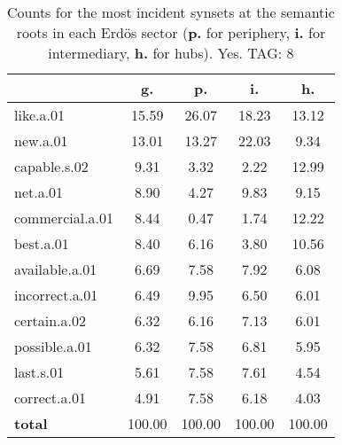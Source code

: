 \begin{table}[h!]
\begin{center}
\begin{tabular}{| l | c | c | c | c |}\hline
 & g. & p. & i. & h. \\\hline
like.a.01 & 15.59  & 26.07  & 18.23  & 13.12 \\\hline
new.a.01 & 13.01  & 13.27  & 22.03  & 9.34 \\\hline
capable.s.02 & 9.31  & 3.32  & 2.22  & 12.99 \\\hline
net.a.01 & 8.90  & 4.27  & 9.83  & 9.15 \\\hline
commercial.a.01 & 8.44  & 0.47  & 1.74  & 12.22 \\\hline
best.a.01 & 8.40  & 6.16  & 3.80  & 10.56 \\\hline
available.a.01 & 6.69  & 7.58  & 7.92  & 6.08 \\\hline
incorrect.a.01 & 6.49  & 9.95  & 6.50  & 6.01 \\\hline
certain.a.02 & 6.32  & 6.16  & 7.13  & 6.01 \\\hline
possible.a.01 & 6.32  & 7.58  & 6.81  & 5.95 \\\hline
last.s.01 & 5.61  & 7.58  & 7.61  & 4.54 \\\hline
correct.a.01 & 4.91  & 7.58  & 6.18  & 4.03 \\\hline
{{\bf total}} & 100.00  & 100.00  & 100.00  & 100.00 \\\hline
\end{tabular}
\caption{Counts for the most incident synsets at the semantic roots in each Erd\"os sector ({\bf p.} for periphery, {\bf i.} for intermediary, {\bf h.} for hubs). Yes. TAG: 8}
\end{center}
\end{table}